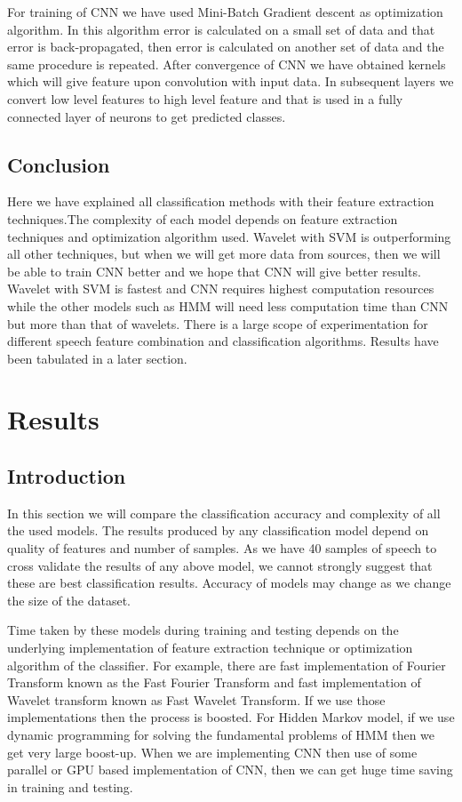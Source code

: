 \documentclass[11pt]{report}
\begin{document}
For training of CNN we have used Mini-Batch Gradient descent as optimization algorithm. In this algorithm error is calculated on a small set of data and that error is back-propagated, then error is calculated on another set of data and the same procedure is repeated. After convergence of CNN we have obtained kernels which will give feature upon convolution with input data. In subsequent layers we convert low level features to high level feature and that is used in a fully connected layer of neurons to get predicted classes.



\section{Conclusion}
Here we have explained all classification methods with their feature extraction techniques.The complexity of each model depends on feature extraction techniques and optimization algorithm used. Wavelet with SVM is outperforming all other techniques, but when we will get more data from sources, then we will be able to train CNN better and we hope that CNN will give better results. Wavelet with SVM is fastest and CNN requires highest computation resources while the other models such as HMM will need less computation time than CNN but more than that of wavelets. There is a large scope of experimentation for different speech feature combination and classification algorithms. Results have been tabulated in a later section.


\newpage
\chapter{Results} 
\section{Introduction}
In this section we will compare the classification accuracy and complexity of all the used models. The results produced by any classification model depend on quality of features and number of samples. As we have 40 samples of speech to cross validate the results of any above model, we cannot strongly suggest that these are best classification results. Accuracy of models may change as we change the size of the dataset. 

Time taken by these models during training and testing depends on the underlying implementation of feature extraction technique or optimization algorithm of the classifier. For example, there are fast implementation of Fourier Transform known as the Fast Fourier Transform and fast implementation of Wavelet transform known as Fast Wavelet Transform. If we use those implementations then the  process is boosted. For Hidden Markov model, if we use dynamic programming for solving the fundamental problems of HMM then we get very large boost-up. When we are implementing CNN then use of some parallel or GPU based implementation of CNN, then we can get huge time saving in training and testing.
\end{document}
